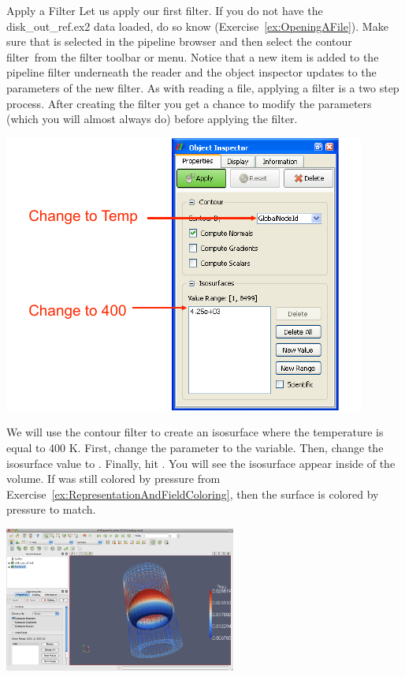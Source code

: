 \begin{exercise}{Apply a Filter}
  \label{ex:ApplyAFilter}%
  Let us apply our first filter.  If you do not have the disk\_out\_ref.ex2
  data loaded, do so know (Exercise~\ref{ex:OpeningAFile}).  Make sure that
   is selected in the pipeline browser and then
  select the contour filter~\contour from the filter toolbar or
   menu.  Notice that a new item is added to the pipeline
  filter underneath the reader and the object inspector updates to the
  parameters of the new filter.  As with reading a file, applying a filter
  is a two step process.  After creating the filter you get a chance to
  modify the parameters (which you will almost always do) before applying
  the filter.

  \begin{inlinefig}
    \includegraphics{images/ContourOptions}
  \end{inlinefig}

  We will use the contour filter to create an isosurface where the
  temperature is equal to 400 K.  First, change the 
  parameter to the  variable.  Then, change the isosurface value
  to .  Finally, hit \apply.  You will see the isosurface appear
  inside of the volume.  If  was still colored by
  pressure from Exercise~\ref{ex:RepresentationAndFieldColoring}, then the
  surface is colored by pressure to match.

  \begin{inlinefig}
    \includegraphics[width=3in]{images/ContourResults}
  \end{inlinefig}
\end{exercise}

